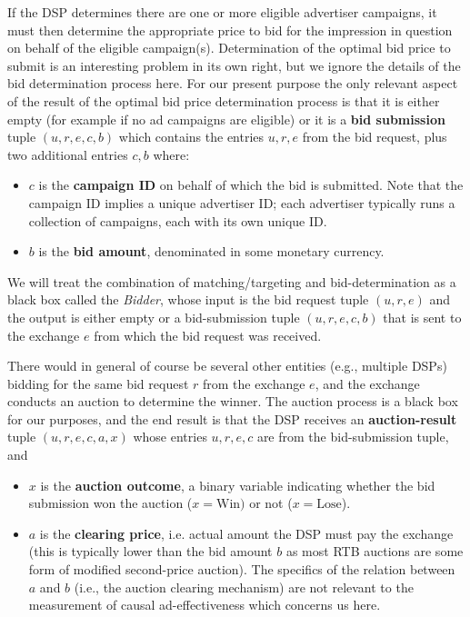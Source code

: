 \documentclass[11pt,a4paper]{article}
\theoremstyle{definition}
\theoremstyle{remark}
\theoremstyle{definition}
\theoremstyle{definition}
\theoremstyle{definition}
\theoremstyle{definition}
\theoremstyle{definition}
\theoremstyle{definition}
\begin{document}
If the DSP determines there are one or more eligible advertiser campaigns, it must then determine the appropriate price to bid for the impression in question on behalf of the eligible campaign(s). Determination of the optimal bid price to submit is an interesting problem in its own right, but we ignore the details of the bid determination process here. 
For our present purpose the only relevant aspect of the result of the optimal bid price determination process is that it is either empty (for example if no ad campaigns are eligible) or it is a {\bf bid submission} tuple 
$(u,r,e,c,b)$ which contains the entries $u,r,e$ from the bid request, plus two additional entries $c,b$ where:
\begin{itemize}
	\item $c$ is the {\bf campaign ID} on behalf of which the bid is submitted. Note that the campaign ID implies a unique advertiser ID; each advertiser typically runs a collection of campaigns, each with its own unique ID. 
	\item $b$ is the {\bf bid amount}, denominated in some monetary currency.
\end{itemize}

We will treat the combination of matching/targeting and bid-determination as a black box called the {\em Bidder}, whose input is the bid request tuple 
$(u,r,e)$ and the output is either empty or a bid-submission tuple  
$(u,r,e,c,b)$ that is sent to the exchange $e$ from which the bid request was received. 

There would in general of course be several other entities (e.g., multiple DSPs) bidding for the same bid request $r$ from the exchange $e$, and the exchange conducts an auction to determine the winner. The auction process is a black box for our purposes, and the end result is that the DSP receives an {\bf auction-result} tuple $(u,r,e,c,a,x)$ whose entries $u,r,e,c$ are from the bid-submission tuple, and 
\begin{itemize}
	\item $x$ is the {\bf auction outcome}, a binary variable indicating whether the bid submission won the auction ($x= \text{Win})$ or not ($x=\text{Lose}$).
	\item $a$ is the {\bf clearing price}, i.e. actual amount the DSP must pay the exchange (this is typically lower than the bid amount $b$ as most RTB auctions are some form of modified second-price auction). The specifics of the relation between $a$ and $b$ (i.e., the auction clearing mechanism) are not relevant to the measurement of causal ad-effectiveness which concerns us here.
\end{itemize}
\end{document}
